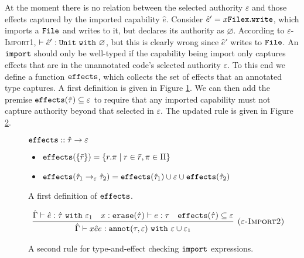 At the moment there is no relation between the selected authority $\varepsilon$ and those effects captured by the imported capability $\hat e$. Consider $\hat e' = {x}{\mathtt{File}}{\mathtt{x.write}}$, which imports a $\mathtt{File}$ and writes to it, but declares its authority as $\varnothing$. According to \textsc{$\varepsilon$-Import1}, $\vdash \hat e': \mathtt{Unit}~\mathtt{with}~ \varnothing$, but this is clearly wrong since $\hat e'$ writes to $\mathtt{File}$. An $\mathtt{import}$ should only be well-typed if the capability being import only captures effects that are in the unannotated code's selected authority $\varepsilon$. To this end we define a function $\mathtt{effects}$, which collects the set of effects that an annotated type captures. A first definition is given in Figure \ref{fig:fx_defn}. We can then add the premise $\mathtt{effects}(\hat \tau) \subseteq \varepsilon$ to require that any imported capability must not capture authority beyond that selected in $\varepsilon$. The updated rule is given in Figure \ref{fig:import_rule_2}.

\begin{figure}[h]

$\mathtt{effects} :: \hat \tau \rightarrow \varepsilon$
\begin{itemize}
	\setlength\itemsep{-0.2em}
	\item[] $\mathtt{effects}(\{ \bar r \}) = \{ r.\pi \mid r \in \bar r, \pi \in \Pi \}$
	\item[] $\mathtt{effects}(\hat \tau_1 \rightarrow_{\varepsilon} \hat \tau_2) = \mathtt{effects}(\hat \tau_1) \cup \varepsilon \cup \mathtt{effects}(\hat \tau_2)$
\end{itemize}
\vspace{-7pt}
\caption{A first definition of $\mathtt{effects}$.}
\label{fig:fx_defn}
\end{figure}

\begin{figure}[h]

\[
\begin{array}{c}

\infer[\textsc{($\varepsilon$-Import2)}]
	{ \hat \Gamma \vdash {x}{\hat e}{e}: \kwa{annot}(\tau, \varepsilon)~\kw{with} \varepsilon \cup \varepsilon_1 }
	{ \hat \Gamma \vdash \hat e: \hat \tau~\kw{with} \varepsilon_1 & x: \kwa{erase}(\hat \tau) \vdash e: \tau & \kwa{effects}(\hat \tau) \subseteq \varepsilon}

\end{array}
\]
\vspace{-7pt}
\caption{A second rule for type-and-effect checking $\mathtt{import}$ expressions.}
\label{fig:import_rule_2}
\end{figure}

